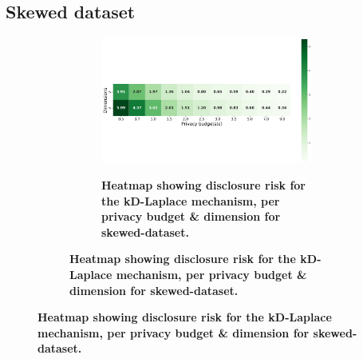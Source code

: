 \subsection{Skewed dataset} \label{appendix:results-privacy-skewed-dataset}
\begin{figure}
    \centering
    \begin{subfigure}[b]{0.85\textwidth}
        \begin{subfigure}[c]{1\textwidth}
            \caption{\textbf{Heatmap showing disclosure risk for the kD-Laplace mechanism, per privacy budget \& dimension for skewed-dataset.}}
            \includegraphics[width=1\textwidth]{Results/kd-laplace/kd-Laplace/skewed-dataset/distance.png}
            \label{fig:privacy-risk_skewed-dataset_adversial_advantage_kd-laplace}
        \end{subfigure}
        \vfill %


\end{subfigure}
\end{figure}
